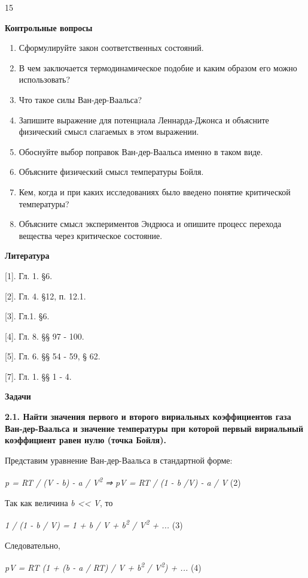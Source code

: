 15

\textbf{Контрольные вопросы}

\begin{enumerate}
\def\labelenumi{\arabic{enumi}.}
\item
  Сформулируйте закон соответственных состояний.
\item
  В чем заключается термодинамическое подобие и каким образом его можно
  использовать?
\item
  Что такое силы Ван-дер-Ваальса?
\item
  Запишите выражение для потенциала Леннарда-Джонса и объясните
  физический смысл слагаемых в этом выражении.
\item
  Обоснуйте выбор поправок Ван-дер-Ваальса именно в таком виде.
\item
  Объясните физический смысл температуры Бойля.
\item
  Кем, когда и при каких исследованиях было введено понятие критической
  температуры?
\item
  Объясните смысл экспериментов Эндрюса и опишите процесс перехода
  вещества через критическое состояние.
\end{enumerate}

\textbf{Литература}

{[}1{]}. Гл. 1. §6.

{[}2{]}. Гл. 4. §12, п. 12.1.

{[}3{]}. Гл.1. §6.

{[}4{]}. Гл. 8. §§ 97 - 100.

{[}5{]}. Гл. 6. §§ 54 - 59, § 62.

{[}7{]}. Гл. 1. §§ 1 - 4.

\textbf{Задачи}

\textbf{2.1. Найти значения первого и второго вириальных коэффициентов
газа Ван-дер-Ваальса и значение температуры при которой первый
вириальный коэффициент равен нулю (точка Бойля).}

\solving{}

Представим уравнение Ван-дер-Ваальса в стандартной форме:

\emph{p = RT / (V - b) - a / V\textsuperscript{2} ⇒ pV = RT / (1 - b /V)
- a / V} (2)

Так как величина \emph{b \textless\textless{} V}, то

\emph{1 / (1 - b / V) = 1 + b / V + b\textsuperscript{2} /
V\textsuperscript{2} + ...} (3)

Следовательно,

\emph{pV = RT (1 + (b - a / RT) / V + b\textsuperscript{2} /
V\textsuperscript{2}) + ...} (4)

